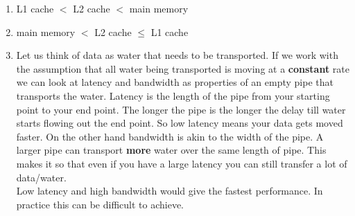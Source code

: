 \documentclass[12pt]{exam}
\begin{document}
    \begin{enumerate}
        \item L1 cache $<$ L2 cache $<$ main memory
        \item main memory $<$ L2 cache $\leq$ L1 cache
        \item Let us think of data as water that needs to be transported. If we work with the assumption that all water being transported is moving at a \textbf{constant} rate we can look at latency and bandwidth as properties of an empty pipe that transports the water. Latency is the length of the pipe from your starting point to your end point. The longer the pipe is the longer the delay till water starts flowing out the end point. So low latency means your data gets moved faster. On the other hand bandwidth is akin to the width of the pipe. A larger pipe can transport \textbf{more} water over the same length of pipe. This makes it so that even if you have a large latency you can still transfer a lot of data/water. \\
        Low latency and high bandwidth would give the fastest performance. In practice this can be difficult to achieve.
    \end{enumerate}
\end{document}
